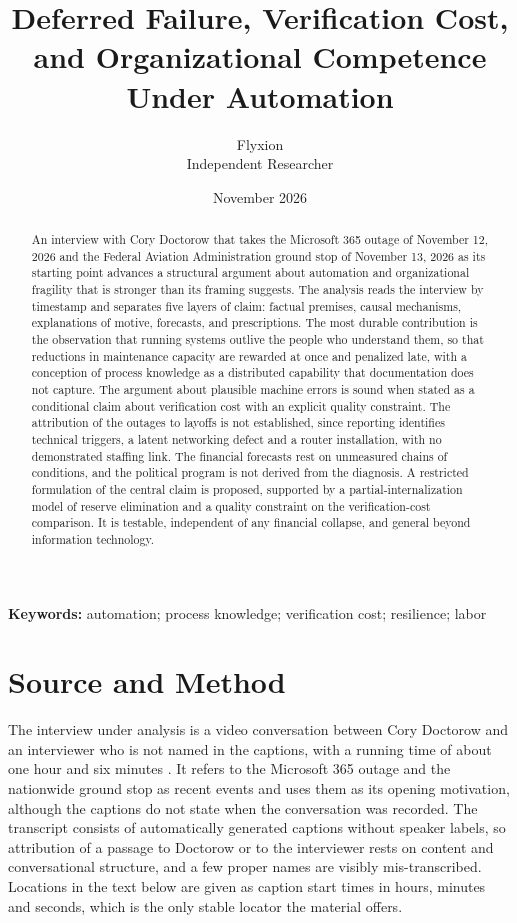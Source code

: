 \documentclass[12pt]{article}
\title{Deferred Failure, Verification Cost, and Organizational Competence Under Automation}
\author{Flyxion\\Independent Researcher}
\date{November 2026}
\begin{document}
\maketitle

\begin{abstract}
\noindent An interview with Cory Doctorow that takes the Microsoft 365 outage of November 12, 2026 and the Federal Aviation Administration ground stop of November 13, 2026 as its starting point advances a structural argument about automation and organizational fragility that is stronger than its framing suggests. The analysis reads the interview by timestamp and separates five layers of claim: factual premises, causal mechanisms, explanations of motive, forecasts, and prescriptions. The most durable contribution is the observation that running systems outlive the people who understand them, so that reductions in maintenance capacity are rewarded at once and penalized late, with a conception of process knowledge as a distributed capability that documentation does not capture. The argument about plausible machine errors is sound when stated as a conditional claim about verification cost with an explicit quality constraint. The attribution of the outages to layoffs is not established, since reporting identifies technical triggers, a latent networking defect and a router installation, with no demonstrated staffing link. The financial forecasts rest on unmeasured chains of conditions, and the political program is not derived from the diagnosis. A restricted formulation of the central claim is proposed, supported by a partial-internalization model of reserve elimination and a quality constraint on the verification-cost comparison. It is testable, independent of any financial collapse, and general beyond information technology.
\end{abstract}

\vspace{1.5em}
\noindent\textbf{Keywords:} automation; process knowledge; verification cost; resilience; labor

\newpage

\section{Source and Method}

The interview under analysis is a video conversation between Cory Doctorow and an interviewer who is not named in the captions, with a running time of about one hour and six minutes \cite{interview}. It refers to the Microsoft 365 outage and the nationwide ground stop as recent events and uses them as its opening motivation, although the captions do not state when the conversation was recorded. The transcript consists of automatically generated captions without speaker labels, so attribution of a passage to Doctorow or to the interviewer rests on content and conversational structure, and a few proper names are visibly mis-transcribed. Locations in the text below are given as caption start times in hours, minutes and seconds, which is the only stable locator the material offers.
\end{document}
